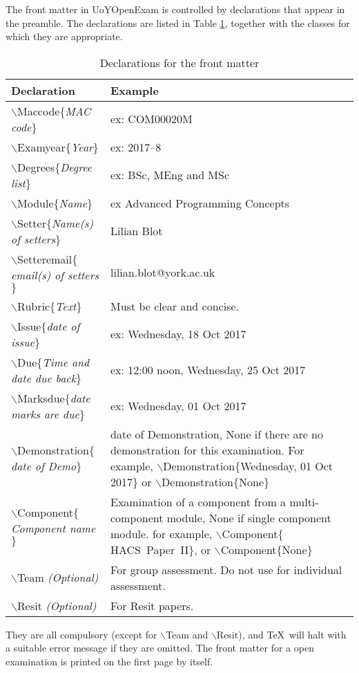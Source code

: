\documentclass[fontsize=12, final]{UoYOpenExam}
\newcommand{\kwd}[1]{\textsf{#1}}
\newcommand{\cmd}[1]{$\backslash$\textsf{#1}}
\newcommand{\tcmd}[3]{\cmd{#1}$\{$#3{#2}$\}$}
\newcommand{\dcmd}[2]{\tcmd{#1}{#2}{\emph}}
\newcommand{\pcmd}[2]{\tcmd{#1}{#2}{\kwd}}
\begin{document}
The front matter in \kwd{UoYOpenExam} is controlled by declarations that
appear in the preamble.  The declarations are listed in Table
\ref{Declarations:T}, together with the classes for which they are
appropriate.
\begin{table}
\begin{center}
\begin{tabular}[t]{|p{5.5cm}|p{7cm}|}
\hline
Declaration&Example\\\hline
\dcmd{Maccode}{MAC code}&ex: COM00020M\\
\dcmd{Examyear}{Year}&ex: 2017--8\\
\dcmd{Degrees}{Degree list}&ex: BSc, MEng and MSc\\
\dcmd{Module}{Name}&ex Advanced Programming Concepts\\
\dcmd{Setter}{Name(s) of setters}&Lilian Blot\\
\dcmd{Setteremail}{email(s) of setters}&lilian.blot@york.ac.uk\\
\dcmd{Rubric}{Text}&Must be clear and concise.\\
\dcmd{Issue}{date of issue}&ex: Wednesday, 18 Oct 2017\\
\dcmd{Due}{Time and date due back}&ex: 12:00 noon, Wednesday, 25 Oct 2017\\
\dcmd{Marksdue}{date marks are due}&ex: Wednesday, 01 Oct 2017\\
\dcmd{Demonstration}{date of Demo}&date of Demonstration,  None if there are no demonstration 
for this examination. For example, \pcmd{Demonstration}{Wednesday, 01 Oct 2017} or \pcmd{Demonstration}{None}\\
\dcmd{Component}{Component name}&Examination of a component from a 
multi-component module, None if single component module. 
for example, \pcmd{Component}{HACS~Paper~II}, or \pcmd{Component}{None}\\\hline
\cmd{Team}  \hfill \emph{(Optional)} & For group assessment. Do not use for individual assessment.\\
\cmd{Resit} \hfill \emph{(Optional)} & For Resit papers.\\\hline
\end{tabular}
\end{center}
\caption{Declarations for the front matter}\label{Declarations:T}
\end{table}
They are all compulsory (except for \cmd{Team} and \cmd{Resit}), and \TeX\ will
halt with a suitable error message if they are omitted.  The front
matter for a open examination is printed on the first page by itself.
\end{document}
